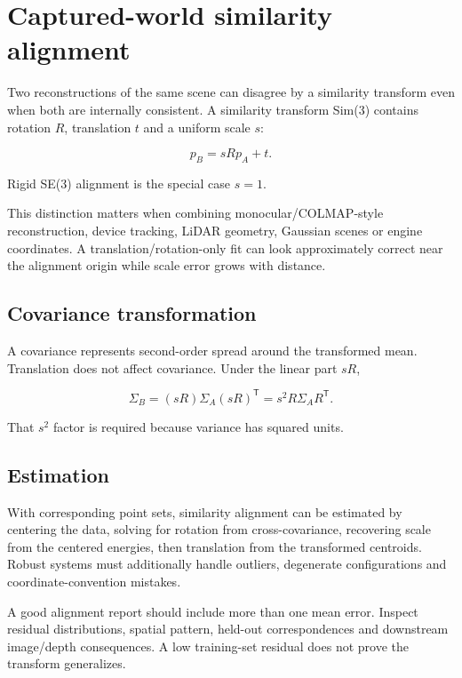 \hypertarget{appendix-5f40b4fea463}{}
\section{Captured-world similarity alignment}\label{appendix-5f40b4fea463-captured-world-similarity-alignment}

Two reconstructions of the same scene can disagree by a similarity transform even when both are internally consistent. A similarity transform Sim(3) contains rotation \(R\), translation \(t\) and a uniform scale \(s\):

\[
p_B = sRp_A+t.
\]

Rigid SE(3) alignment is the special case \(s=1\).

This distinction matters when combining monocular/COLMAP-style reconstruction, device tracking, LiDAR geometry, Gaussian scenes or engine coordinates. A translation/rotation-only fit can look approximately correct near the alignment origin while scale error grows with distance.

\subsection{Covariance transformation}\label{appendix-5f40b4fea463-covariance-transformation}

A covariance represents second-order spread around the transformed mean. Translation does not affect covariance. Under the linear part \(sR\),

\[
\Sigma_B
=
(sR)\Sigma_A(sR)^{\mathsf T}
=
s^2 R\Sigma_A R^{\mathsf T}.
\]

That \(s^2\) factor is required because variance has squared units.

\subsection{Estimation}\label{appendix-5f40b4fea463-estimation}

With corresponding point sets, similarity alignment can be estimated by centering the data, solving for rotation from cross-covariance, recovering scale from the centered energies, then translation from the transformed centroids. Robust systems must additionally handle outliers, degenerate configurations and coordinate-convention mistakes.

A good alignment report should include more than one mean error. Inspect residual distributions, spatial pattern, held-out correspondences and downstream image/depth consequences. A low training-set residual does not prove the transform generalizes.

